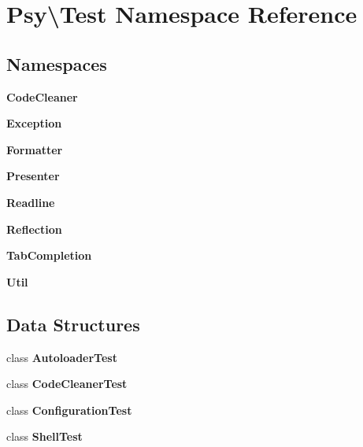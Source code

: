 \section{Psy\textbackslash{}Test Namespace Reference}
\label{namespace_psy_1_1_test}
\subsection*{Namespaces}
\begin{DoxyCompactItemize}
\item 
 {\bf Code\+Cleaner}
\item 
 {\bf Exception}
\item 
 {\bf Formatter}
\item 
 {\bf Presenter}
\item 
 {\bf Readline}
\item 
 {\bf Reflection}
\item 
 {\bf Tab\+Completion}
\item 
 {\bf Util}
\end{DoxyCompactItemize}
\subsection*{Data Structures}
\begin{DoxyCompactItemize}
\item 
class {\bf Autoloader\+Test}
\item 
class {\bf Code\+Cleaner\+Test}
\item 
class {\bf Configuration\+Test}
\item 
class {\bf Shell\+Test}
\end{DoxyCompactItemize}
